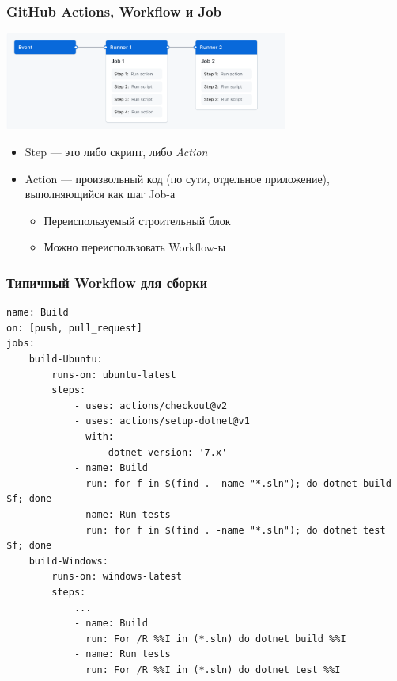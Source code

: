 \documentclass{../../slides-style}
\begin{document}
    \begin{frame}
        \frametitle{GitHub Actions, Workflow и Job}
        \begin{center}
            \includegraphics[width=0.7\textwidth]{githubActionsWorkflow}
        \end{center}
        \begin{itemize}
            \item Step --- это либо скрипт, либо \emph{Action}
            \item Action --- произвольный код (по сути, отдельное приложение), выполняющийся как шаг Job-а
            \begin{itemize}
                \item Переиспользуемый строительный блок
                \item Можно переиспользовать Workflow-ы
            \end{itemize}
        \end{itemize}
    \end{frame}

    \begin{frame}[fragile]
        \frametitle{Типичный Workflow для сборки}
        \begin{scriptsize}
            \begin{verbatim}
name: Build
on: [push, pull_request]
jobs:
    build-Ubuntu:
        runs-on: ubuntu-latest
        steps:
            - uses: actions/checkout@v2
            - uses: actions/setup-dotnet@v1
              with:
                  dotnet-version: '7.x'
            - name: Build
              run: for f in $(find . -name "*.sln"); do dotnet build $f; done
            - name: Run tests
              run: for f in $(find . -name "*.sln"); do dotnet test $f; done
    build-Windows:
        runs-on: windows-latest
        steps:
            ...
            - name: Build
              run: For /R %%I in (*.sln) do dotnet build %%I
            - name: Run tests
              run: For /R %%I in (*.sln) do dotnet test %%I
            \end{verbatim}
        \end{scriptsize}
    \end{frame}
\end{document}

